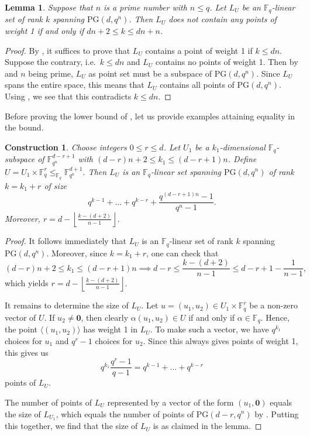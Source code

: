 \documentclass[11pt]{article}
\newtheorem{lemma}[theorem]{Lemma}
\newtheorem{construction}[theorem]{Construction}
\theoremstyle{definition}
\newcommand{\fqn}{\mathbb{F}_{q^n}}
\newcommand{\fq}{{\mathbb F}_{q}}
\newcommand{\PG}{\mathrm{PG}}
\newcommand{\pg}{\PG}
\newcommand{\floor}[1]{\left \lfloor #1 \right \rfloor}
\begin{document}
\begin{lemma}
 \label{lm:NPrimeNoPtsOfWt1}
 Suppose that $n$ is a prime number with $n \leq q$.
 Let $L_U$ be an $\fq$-linear set of rank $k$ spanning $\pg(d,q^n)$.
 Then $L_U$ does not contain any points of weight 1 if and only if $dn+2 \leq k \leq dn + n$.
\end{lemma}

\begin{proof}
 By , it suffices to prove that $L_U$ contains a point of weight 1 if $k \leq dn$.
 Suppose the contrary, i.e.\ $k \leq dn$ and $L_U$ contains no points of weight 1.
 Then by  and $n$ being prime, $L_U$ as point set must be a subspace of $\pg(d,q^n)$.
 Since $L_U$ spans the entire space, this means that $L_U$ contains all points of $\pg(d,q^n)$.
 Using , we see that this contradicts $k \leq dn$.
\end{proof}

Before proving the lower bound of , let us provide examples attaining equality in the bound.

\begin{construction} \label{Constr:Prime}
 Choose integers $0 \leq r \leq d$.
 Let $U_1$ be a $k_1$-dimensional $\fq$-subspace of $\fqn^{d-r+1}$ with $(d-r)n + 2 \leq k_1 \leq (d-r+1)n$.
 Define $U = U_1 \times \fq^r \leq_{\fq} \fqn^{d+1}$.
 Then $L_U$ is an $\fq$-linear set spanning $\pg(d,q^n)$ of rank $k = k_1 + r$ of size
 \[
  q^{k-1} + \ldots + q^{k-r} + \frac{q^{(d-r+1)n}-1}{q^n-1}.
 \]
 Moreover, $r = d-\floor{\frac{k-(d+2)}{n-1}}$.
\end{construction}

\begin{proof}
 It follows immediately that $L_U$ is an $\fq$-linear set of rank $k$ spanning $\pg(d,q^n)$.
 Moreover, since $k = k_1 + r$, one can check that
 \[
  (d-r)n + 2 \leq k_1 \leq (d-r+1)n \implies d-r \leq \frac{k-(d+2)}{n-1} \leq d-r+1 - \frac{1}{n-1},
 \]
 which yields $r = d-\floor{\frac{k-(d+2)}{n-1}}$.

 It remains to determine the size of $L_U$.
 Let $u = (u_1,u_2) \in U_1 \times \fq^r$ be a non-zero vector of $U$.
 If $u_2 \neq \mathbf 0$, then clearly $\alpha (u_1, u_2) \in U$ if and only if $\alpha \in \fq$.
 Hence, the point $\langle (u_1,u_2) \rangle$ has weight 1 in $L_U$.
 To make such a vector, we have $q^{k_1}$ choices for $u_1$ and $q^r-1$ choices for $u_2$.
 Since this always gives points of weight 1, this gives us
 \[
  q^{k_1} \frac{q^r-1}{q-1} = q^{k-1} + \ldots + q^{k-r}
 \]
 points of $L_U$.

 The number of points of $L_U$ represented by a vector of the form $(u_1,\mathbf 0)$ equals the size of $L_{U_1}$, which equals the number of points of $\pg(d-r,q^n)$ by .
 Putting this together, we find that the size of $L_U$ is as claimed in the lemma.
\end{proof}
\end{document}
